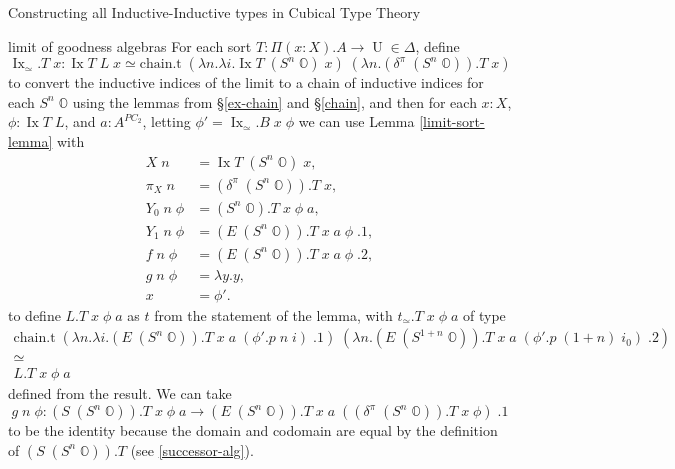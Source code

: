 \documentclass[acmsmall,review]{acmart}\settopmatter{printfolios=true,printccs=false,printacmref=false}
\DeclareMathOperator{\UU}{U}
\DeclareMathOperator{\Ix}{Ix}
\newcommand{\bbO}{\mathbb{O}}
\begin{document}
\begin{section}{Constructing all Inductive-Inductive types in Cubical Type Theory}
\begin{subsection}{limit of goodness algebras}
For each sort $T : \Pi(x : X).A \to \UU \in \Delta$, define \[\Ix_\simeq.T\;x : \Ix T\;L\;x\simeq\text{chain.t}\;(\lambda n.\lambda i.\Ix T\;(S^n\;\bbO)\;x)\;(\lambda n.(\delta^\pi\;(S^n\;\bbO)).T\;x)\] to convert the inductive indices of the limit to a chain of inductive indices for each $S^n\;\bbO$ using the lemmas from \S\ref{ex-chain} and \S\ref{chain},
and then for each $x : X$, $\phi : \Ix T\;L$, and $a : A^{PC_2}$, letting $\phi' = \Ix_\simeq.B\;x\;\phi$ we can use Lemma \ref{limit-sort-lemma} with \begin{align*}
X\;n &= \Ix T\;(S^n\;\bbO)\;x,\\
\pi_X\;n &= (\delta^\pi\;(S^n\;\bbO)).T\;x,\\
Y_0\;n\;\phi &= (S^n\;\bbO).T\;x\;\phi\;a,\\
Y_1\;n\;\phi &= (E\;(S^n\;\bbO)).T\;x\;a\;\phi\;.1,\\
f\;n\;\phi &= (E\;(S^n\;\bbO)).T\;x\;a\;\phi\;.2,\\
g\;n\;\phi &= \lambda y.y,\\
x &= \phi'.
\end{align*}
to define $L.T\;x\;\phi\;a$ as $t$ from the statement of the lemma, with $t_\simeq.T\;x\;\phi\;a$ of type \begin{gather*}\text{chain.t}\;(\lambda n.\lambda i.(E\;(S^n\;\bbO)).T\;x\;a\;(\phi'.p\;n\;i)\;.1)\;(\lambda n.(E\;(S^{1+n}\;\bbO)).T\;x\;a\;(\phi'.p\;(1+n)\;i_0)\;.2)\\ \simeq\\ L.T\;x\;\phi\;a\end{gather*} defined from the result. We can take \[g\;n\;\phi : (S\;(S^n\;\bbO)).T\;x\;\phi\;a \to (E\;(S^n\;\bbO)).T\;x\;a\;((\delta^\pi\;(S^n\;\bbO)).T\;x\;\phi)\;.1\] to be the identity because the domain and codomain are equal by the definition of $(S\;(S^n\;\bbO)).T$ (see \ref{successor-alg}).


\end{subsection}
\end{section}
\end{document}
